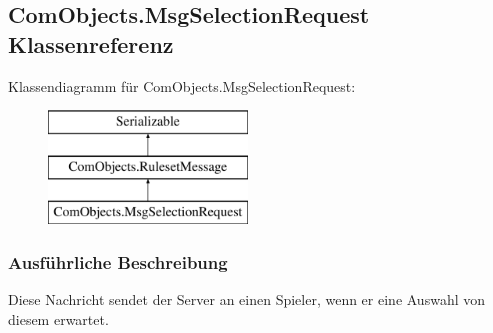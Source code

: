 \hypertarget{a00066}{\subsection{Com\-Objects.\-Msg\-Selection\-Request Klassenreferenz}
\label{a00066}
}
Klassendiagramm für Com\-Objects.\-Msg\-Selection\-Request\-:\begin{figure}[H]
\begin{center}
\leavevmode
\includegraphics[height=3.000000cm]{a00066}
\end{center}
\end{figure}


\subsubsection{Ausführliche Beschreibung}
Diese Nachricht sendet der Server an einen Spieler, wenn er eine Auswahl von diesem erwartet. 